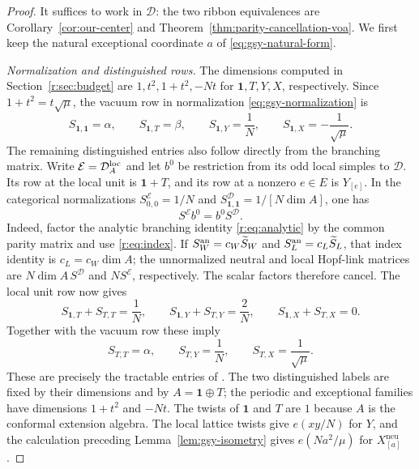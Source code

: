 \documentclass[11pt,a4paper]{article}
\numberwithin{equation}{section}
\theoremstyle{definition}\newtheorem{definition}[theorem]{Definition}
\theoremstyle{remark}\newtheorem{remark}[theorem]{Remark}
\newcommand{\one}{\mathbf1}\newcommand{\B}{\mathcal B}\newcommand{\W}{W_N}
\begin{document}
\begin{proof}
It suffices to work in $\mathcal D$: the two ribbon equivalences
are Corollary~\ref{cor:our-center} and
Theorem~\ref{thm:parity-cancellation-voa}. We first keep the natural exceptional
coordinate $a$ of \eqref{eq:gsy-natural-form}.

\emph{Normalization and distinguished rows.}
The dimensions computed in Section~\ref{r:sec:budget} are
$1,t^2,1+t^2,-Nt$ for $\one,T,Y,X$, respectively.
Since $1+t^2=t\sqrt\mu$, the vacuum row in normalization
\eqref{eq:gsy-normalization} is
\[
 S_{\one,\one}=\alpha,\qquad S_{\one,T}=\beta,\qquad
 S_{\one,Y}=\frac1N,\qquad S_{\one,X}=-\frac1{\sqrt\mu}.
\]
The remaining distinguished entries also follow directly from the
branching matrix. Write $\mathcal E=\mathcal D_A^{\mathrm{loc}}$ and let
$b^0$ be restriction from its odd local simples to $\mathcal D$.
Its row at the local unit is $\one+T$, and its row at a nonzero
$e\in E$ is $Y_{[e]}$. In the categorical normalizations
$S^{\mathcal E}_{0,0}=1/N$ and
$S^{\mathcal D}_{\one,\one}=1/[N\dim A]$, one has
\[
              S^{\mathcal E}b^0=b^0S^{\mathcal D}.
\]
Indeed, factor the analytic branching identity
\eqref{r:eq:analytic} by the common parity matrix and use
\eqref{r:eq:index}. If $S_W^{\rm an}=c_W\widetilde S_W$ and
$S_L^{\rm an}=c_L\widetilde S_L$, that index identity is
$c_L=c_W\dim A$; the unnormalized neutral and local Hopf-link
matrices are $N\dim A\,S^{\mathcal D}$ and
$N S^{\mathcal E}$, respectively. The scalar factors therefore
cancel. The local unit row now gives
\[
 S_{\one,T}+S_{T,T}=\frac1N,\qquad
 S_{\one,Y}+S_{T,Y}=\frac2N,\qquad
 S_{\one,X}+S_{T,X}=0.
\]
Together with the vacuum row these imply
\[
 S_{T,T}=\alpha,\qquad S_{T,Y}=\frac1N,\qquad
 S_{T,X}=\frac1{\sqrt\mu}.
\]
These are precisely the tractable entries of
\cite[Section 5.1]{gsy}. The two distinguished labels are fixed by
their dimensions and by $A=\one\oplus T$; the periodic and
exceptional families have dimensions $1+t^2$ and $-Nt$.
The twists of $\one$ and $T$ are $1$ because $A$ is the conformal
extension algebra. The local lattice twists give $e(xy/N)$ for $Y$,
and the calculation preceding Lemma~\ref{lem:gsy-isometry} gives
$e(Na^2/\mu)$ for $X^{\mathrm{neu}}_{[a]}$.


\end{proof}
\end{document}
